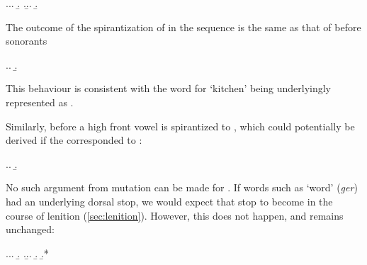 \ex.\label{ex:k-spirantization}\a.\a.
\b.
\z.\b.\a.
\b.

The outcome of the spirantization of \ipa{[ʧ]} in the sequence \ipa{[ʧɥ]} is the same as that of \ipa{[k]} before sonorants

\ex.\a.
\b.


This behaviour is consistent with the word for `kitchen' being underlyingly represented as .

Similarly, \ipa{[ʧ]} before a high front vowel is spirantized to \ipa{[h]}, which could potentially be derived if the \ipa{[ʧ]} corresponded to :

\ex.\a.
\b.

No such argument from mutation can be made for \ipa{[dʒ]}. If words such as \ipa{[dʒiːr]} `word' (\emph{ger}) had an underlying dorsal stop, we would expect that stop to become \ipa{[h]} in the course of lenition (\cref{sec:lenition}). However, this does not happen, and \ipa{[dʒ]} remains unchanged:

\ex.\label{ex:no-dz-as-g}\a.\a.
\b.
\z.\b.\a.
\b.
\b.*\mbi{[i ˈhiːr]}

